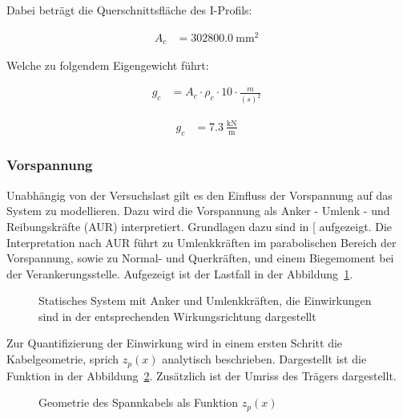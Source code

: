\documentclass[
  11pt,
  letterpaper,
]{scrreprt}
\begin{document}
Dabei beträgt die Querschnittsfläche des I-Profils:

$$
\begin{aligned}
A_{c} &= 302800.0\ \mathrm{mm}^{2} \;
\end{aligned}
$$

Welche zu folgendem Eigengewicht führt:

$$
\begin{aligned}
g_{c} &= A_{c} \cdot \rho_{c} \cdot 10 \cdot \frac{ m }{ \left( s \right) ^{ 2 } } \; 
\end{aligned}
$$

$$
\begin{aligned}
g_{c} &= 7.3\ \frac{\mathrm{kN}}{\mathrm{m}} \;
\end{aligned}
$$

\subsubsection{Vorspannung}\label{vorspannung-1}

Unabhängig von der Versuchslast gilt es den Einfluss der Vorspannung auf
das System zu modellieren. Dazu wird die Vorspannung als Anker - Umlenk
- und Reibungskräfte (AUR) interpretiert. Grundlagen dazu sind in
{[}\citeproc{ref-thoma_vorspannung_2020}{6}{]} aufgezeigt. Die
Interpretation nach AUR führt zu Umlenkkräften im parabolischen Bereich
der Vorspannung, sowie zu Normal- und Querkräften, und einem Biegemoment
bei der Verankerungsstelle. Aufgezeigt ist der Lastfall in der
Abbildung~\ref{fig-t6_lastfall_p}.

\begin{figure}[H]


\caption{\label{fig-t6_lastfall_p}Statisches System mit Anker und
Umlenkkräften, die Einwirkungen sind in der entsprechenden
Wirkungsrichtung dargestellt}

\end{figure}%

Zur Quantifizierung der Einwirkung wird in einem ersten Schritt die
Kabelgeometrie, sprich \(z_p(x)\) analytisch beschrieben. Dargestellt
ist die Funktion in der Abbildung~\ref{fig-z_p_von_x}. Zusätzlich ist
der Umriss des Trägers dargestellt.

\begin{figure}[H]


\caption{\label{fig-z_p_von_x}Geometrie des Spannkabels als Funktion
\(z_p(x)\)}

\end{figure}%
\end{document}
